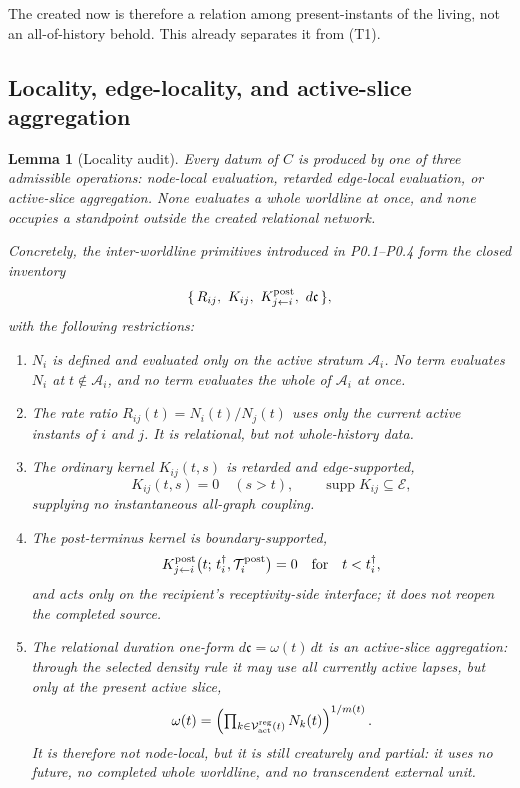 \documentclass[11pt,a4paper]{article}
\theoremstyle{definition}
\theoremstyle{plain}
\newtheorem{lemma}[definition]{Lemma}
\theoremstyle{remark}
\begin{document}
\noindent The created now is therefore a relation among present-instants of the living,
not an all-of-history behold. This already separates it from (T1).

\subsection{Locality, edge-locality, and active-slice aggregation}

\begin{lemma}[Locality audit]\label{lem:local}
Every datum of \(C\) is produced by one of three admissible operations: node-local
evaluation, retarded edge-local evaluation, or active-slice aggregation. None evaluates
a whole worldline at once, and none occupies a standpoint outside the created relational
network.

Concretely, the inter-worldline primitives introduced in P0.1--P0.4 form the closed
inventory
\[
\{\,R_{ij},\ K_{ij},\ K^{\rm post}_{j\leftarrow i},\ d\mathfrak c\,\},
\]
with the following restrictions:
\begin{enumerate}[label=\textup{(\roman*)},leftmargin=1.2cm]
\item \(N_i\) is defined and evaluated only on the active stratum \(\mathcal A_i\). No
term evaluates \(N_i\) at \(t\notin\mathcal A_i\), and no term evaluates the whole of
\(\mathcal A_i\) at once.

\item The rate ratio \(R_{ij}(t)=N_i(t)/N_j(t)\) uses only the current active instants of
\(i\) and \(j\). It is relational, but not whole-history data.

\item The ordinary kernel \(K_{ij}(t,s)\) is retarded and edge-supported,
\[
K_{ij}(t,s)=0\quad(s>t),
\qquad
\operatorname{supp}K_{ij}\subseteq\mathcal E,
\]
supplying no instantaneous all-graph coupling.

\item The post-terminus kernel is boundary-supported,
\[
K^{\rm post}_{j\leftarrow i}\bigl(t;\,t_i^\dagger,\mathcal T_i^{\rm post}\bigr)=0
\quad\text{for}\quad t<t_i^\dagger,
\]
and acts only on the recipient's receptivity-side interface; it does not reopen the
completed source.

\item The relational duration one-form \(d\mathfrak c=\omega(t)\,dt\) is an active-slice
aggregation: through the selected density rule it may use all currently active lapses,
but only at the present active slice,
\[
\omega(t)=\left(\textstyle\prod_{k\in\mathcal V_{\rm act}^{\rm reg}(t)}N_k(t)\right)^{1/m(t)}.
\]
It is therefore not node-local, but it is still creaturely and partial: it uses no
future, no completed whole worldline, and no transcendent external unit.
\end{enumerate}
\end{lemma}
\end{document}
